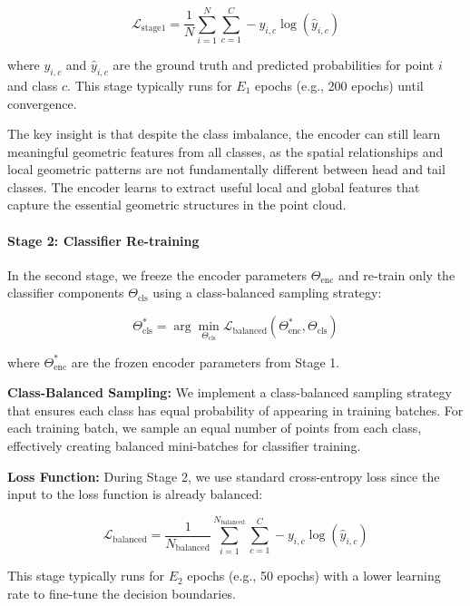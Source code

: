 \documentclass[preprint,12pt]{elsarticle}
\begin{document}
\begin{equation}
\mathcal{L}_{\text{stage1}} = \frac{1}{N} \sum_{i=1}^{N} \sum_{c=1}^{C} -y_{i,c} \log(\hat{y}_{i,c})
\end{equation}

where $y_{i,c}$ and $\hat{y}_{i,c}$ are the ground truth and predicted probabilities for point $i$ and class $c$. This stage typically runs for $E_1$ epochs (e.g., 200 epochs) until convergence.

The key insight is that despite the class imbalance, the encoder can still learn meaningful geometric features from all classes, as the spatial relationships and local geometric patterns are not fundamentally different between head and tail classes. The encoder learns to extract useful local and global features that capture the essential geometric structures in the point cloud.

\paragraph{Stage 2: Classifier Re-training}
In the second stage, we freeze the encoder parameters $\Theta_{\text{enc}}$ and re-train only the classifier components $\Theta_{\text{cls}}$ using a class-balanced sampling strategy:

\begin{equation}
\Theta_{\text{cls}}^* = \arg\min_{\Theta_{\text{cls}}} \mathcal{L}_{\text{balanced}}(\Theta_{\text{enc}}^*, \Theta_{\text{cls}})
\end{equation}

where $\Theta_{\text{enc}}^*$ are the frozen encoder parameters from Stage 1.

\textbf{Class-Balanced Sampling:} We implement a class-balanced sampling strategy that ensures each class has equal probability of appearing in training batches. For each training batch, we sample an equal number of points from each class, effectively creating balanced mini-batches for classifier training.

\textbf{Loss Function:} During Stage 2, we use standard cross-entropy loss since the input to the loss function is already balanced:

\begin{equation}
\mathcal{L}_{\text{balanced}} = \frac{1}{N_{\text{balanced}}} \sum_{i=1}^{N_{\text{balanced}}} \sum_{c=1}^{C} -y_{i,c} \log(\hat{y}_{i,c})
\end{equation}

This stage typically runs for $E_2$ epochs (e.g., 50 epochs) with a lower learning rate to fine-tune the decision boundaries.
\end{document}
